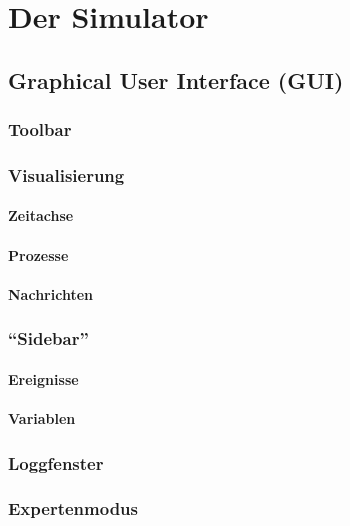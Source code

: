 \chapter{Der Simulator}

\section{Graphical User Interface (GUI)}

\subsection{Toolbar}

\subsection{Visualisierung}

\subsubsection{Zeitachse}

\subsubsection{Prozesse}

\subsubsection{Nachrichten}

\subsection{``Sidebar''}

\subsubsection{Ereignisse}

\subsubsection{Variablen}

\subsection{Loggfenster}

\subsection{Expertenmodus}


